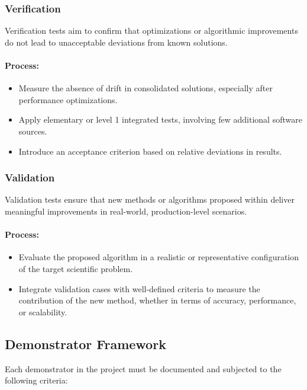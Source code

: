 \subsubsection{Verification}
\label{sec:verification}

Verification tests aim to confirm that optimizations or algorithmic improvements do not lead to unacceptable deviations from known solutions.

\paragraph{Process:}
\begin{itemize}
    \item Measure the absence of drift in consolidated solutions, especially after performance optimizations.
    \item Apply elementary or level 1 integrated tests, involving few additional software sources.
    \item Introduce an acceptance criterion based on relative deviations in results.
\end{itemize}

\subsubsection{Validation}
\label{sec:validation}

Validation tests ensure that new methods or algorithms proposed within \exama deliver meaningful improvements in real-world, production-level scenarios.

\paragraph{Process:}
\begin{itemize}
    \item Evaluate the proposed algorithm in a realistic or representative configuration of the target scientific problem.
    \item Integrate validation cases with well-defined criteria to measure the contribution of the new method, whether in terms of accuracy, performance, or scalability.
\end{itemize}

\subsection{Demonstrator Framework}
\label{sec:demonstrators}

Each demonstrator in the \exama project must be documented and subjected to the following criteria:

